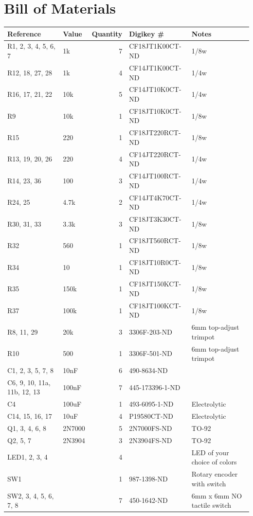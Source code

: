 \documentclass[11pt]{article}
\begin{document}
\section{Bill of Materials}
\label{sec:orgd9a9a71}
\begin{center}
\begin{tabular}{llrll}
\textbf{Reference} & \textbf{Value} & \textbf{Quantity} & \textbf{Digikey \#} & \textbf{Notes}\\
\hline
R1, 2, 3, 4, 5, 6, 7 & 1k & 7 & CF18JT1K00CT-ND & 1/8w\\
R12, 18, 27, 28 & 1k & 4 & CF14JT1K00CT-ND & 1/4w\\
R16, 17, 21, 22 & 10k & 5 & CF14JT10K0CT-ND & 1/4w\\
R9 & 10k & 1 & CF18JT10K0CT-ND & 1/8w\\
R15 & 220 & 1 & CF18JT220RCT-ND & 1/8w\\
R13, 19, 20, 26 & 220 & 4 & CF14JT220RCT-ND & 1/4w\\
R14, 23, 36 & 100 & 3 & CF14JT100RCT-ND & 1/4w\\
R24, 25 & 4.7k & 2 & CF14JT4K70CT-ND & 1/4w\\
R30, 31, 33 & 3.3k & 3 & CF18JT3K30CT-ND & 1/8w\\
R32 & 560 & 1 & CF18JT560RCT-ND & 1/8w\\
R34 & 10 & 1 & CF18JT10R0CT-ND & 1/8w\\
R35 & 150k & 1 & CF18JT150KCT-ND & 1/8w\\
R37 & 100k & 1 & CF18JT100KCT-ND & 1/8w\\
R8, 11, 29 & 20k & 3 & 3306F-203-ND & 6mm top-adjust trimpot\\
R10 & 500 & 1 & 3306F-501-ND & 6mm top-adjust trimpot\\
C1, 2, 3, 5, 7, 8 & 10nF & 6 & 490-8634-ND & \\
C6, 9, 10, 11a, 11b, 12, 13 & 100nF & 7 & 445-173396-1-ND & \\
C4 & 100uF & 1 & 493-6095-1-ND & Electrolytic\\
C14, 15, 16, 17 & 10uF & 4 & P19580CT-ND & Electrolytic\\
Q1, 3, 4, 6, 8 & 2N7000 & 5 & 2N7000FS-ND & TO-92\\
Q2, 5, 7 & 2N3904 & 3 & 2N3904FS-ND & TO-92\\
LED1, 2, 3, 4 &  & 4 &  & LED of your choice of colors\\
SW1 &  & 1 & 987-1398-ND & Rotary encoder with switch\\
SW2, 3, 4, 5, 6, 7, 8 &  & 7 & 450-1642-ND & 6mm x 6mm NO tactile switch\\

\end{tabular}
\end{center}
\end{document}
